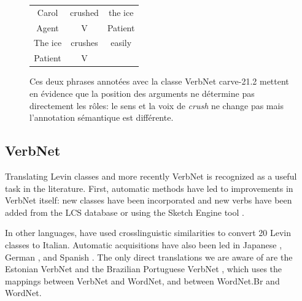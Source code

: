 \label{presentation_framenet}

\begin{figure}[ht]
    \centering
    \begin{tabular}{ccc}
        \toprule
        Carol & crushed   & the ice \\
        Agent & V         & Patient \\
        \midrule
        The ice & crushes & easily  \\
        Patient & V       &         \\
        \bottomrule
    \end{tabular}
    \caption{\label{fig:example_srl}Ces deux phrases annotées avec la classe VerbNet carve-21.2 mettent en évidence que la position des arguments ne détermine pas directement les rôles: le sens et la voix de \textit{crush} ne change pas mais l'annotation sémantique est différente.}
\end{figure}



\subsection{VerbNet}

Translating Levin classes and more recently VerbNet is recognized as a useful
task in the literature. First, automatic methods have led to improvements in
VerbNet itself: new classes have been incorporated
\citep{korhonen2004extended} and new verbs have been added from the LCS
database \citep{dorr2001lcs} or using the Sketch Engine tool
\citep{bonial2013expanding}.

In other languages, \cite{merlo2002multilingual} have used crosslinguistic
similarities to convert 20 Levin classes to Italian. Automatic acquisitions
have also been led in Japanese \citep{suzuki2009classifying}, German
\citep{im2006experiments}, and Spanish \citep{ferrer2004towards}. The
only direct translations we are aware of are the Estonian VerbNet
\citep{jentson2014verbnet} and the Brazilian Portuguese VerbNet
\citep{scarton2012towards}, which uses the mappings between VerbNet and
WordNet, and between WordNet.Br and WordNet.

